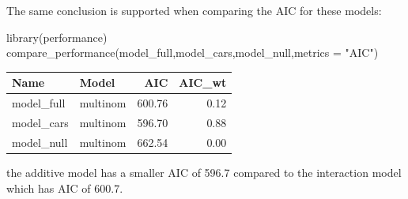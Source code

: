 \documentclass[
  letterpaper,
  DIV=11,
  numbers=noendperiod]{scrartcl}
\newenvironment{Shaded}{\begin{snugshade}}{\end{snugshade}}
\newcommand{\AttributeTok}[1]{\textcolor[rgb]{0.40,0.45,0.13}{#1}}
\newcommand{\FunctionTok}[1]{\textcolor[rgb]{0.28,0.35,0.67}{#1}}
\newcommand{\NormalTok}[1]{\textcolor[rgb]{0.00,0.23,0.31}{#1}}
\newcommand{\StringTok}[1]{\textcolor[rgb]{0.13,0.47,0.30}{#1}}
\begin{document}
The same conclusion is supported when comparing the AIC for these
models:

\begin{Shaded}
\begin{Highlighting}[]
\FunctionTok{library}\NormalTok{(performance)}
\FunctionTok{compare\_performance}\NormalTok{(model\_full,model\_cars,model\_null,}\AttributeTok{metrics =} \StringTok{"AIC"}\NormalTok{)}
\end{Highlighting}
\end{Shaded}

\begin{longtable}[]{@{}llrr@{}}
\toprule\noalign{}
Name & Model & AIC & AIC\_wt \\
\midrule\noalign{}
\endhead
\bottomrule\noalign{}
\endlastfoot
model\_full & multinom & 600.76 & 0.12 \\
model\_cars & multinom & 596.70 & 0.88 \\
model\_null & multinom & 662.54 & 0.00 \\
\end{longtable}

the additive model has a smaller AIC of 596.7 compared to the
interaction model which has AIC of 600.7.
\end{document}
